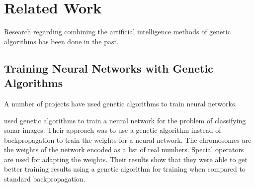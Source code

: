 \chapter[Related Work]{Related Work}
Research regarding combining the artificial intelligence methods of
genetic algorithms has been done in the past.



\section{Training Neural Networks with Genetic Algorithms}
A number of projects have used genetic algorithms to train neural
networks.

\cite{montana} used genetic algorithms to train a neural network for
the problem of classifying sonar images.
Their approach was to use a genetic algorithm instead of
backpropagation to train the weights for a neural network.
The chromosomes are the weights of the network encoded as a list of
real numbers.
Special operators are used for adapting the weights.
Their results show that they were able to get better training results
using a genetic algorithm for training when compared to standard
backpropagation.

\cite{whitley} 


 

